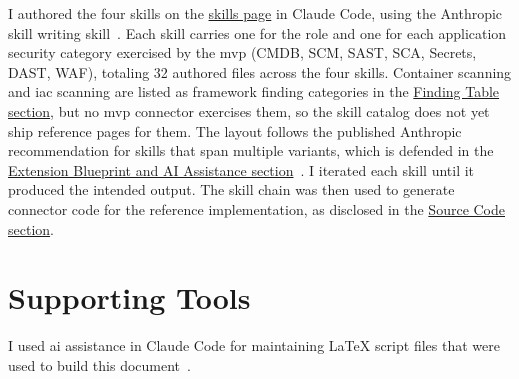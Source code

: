 I authored the four skills on the \href{https://vkraus.github.io/appsec-mvp/platform/reference/connector-skills/}{skills page} in Claude Code, using the Anthropic skill writing skill~\parencite{Anthropic2026ClaudeCode, Anthropic2026SkillsBestPractices}. Each skill carries one  for the role and one  for each application security category exercised by the \gls{mvp} (CMDB, SCM, SAST, SCA, Secrets, DAST, WAF), totaling 32 authored files across the four skills. Container scanning and \gls{iac} scanning are listed as framework finding categories in the \hyperref[sec:silver-findings-design]{Finding Table section}, but no \gls{mvp} connector exercises them, so the skill catalog does not yet ship reference pages for them. The layout follows the published Anthropic recommendation for skills that span multiple variants, which is defended in the \hyperref[sec:extension-blueprint-ai]{Extension Blueprint and AI Assistance section}~\parencite{Anthropic2026SkillsBestPractices}. I iterated each skill until it produced the intended output. The skill chain was then used to generate connector code for the reference implementation, as disclosed in the \hyperref[sec:genai-source-code]{Source Code section}.

\section{Supporting Tools}
\label{sec:genai-supporting-tools}

I used \gls{ai} assistance in Claude Code for maintaining \LaTeX{} script files that were used to build this document~\parencite{Anthropic2026ClaudeCode}.
